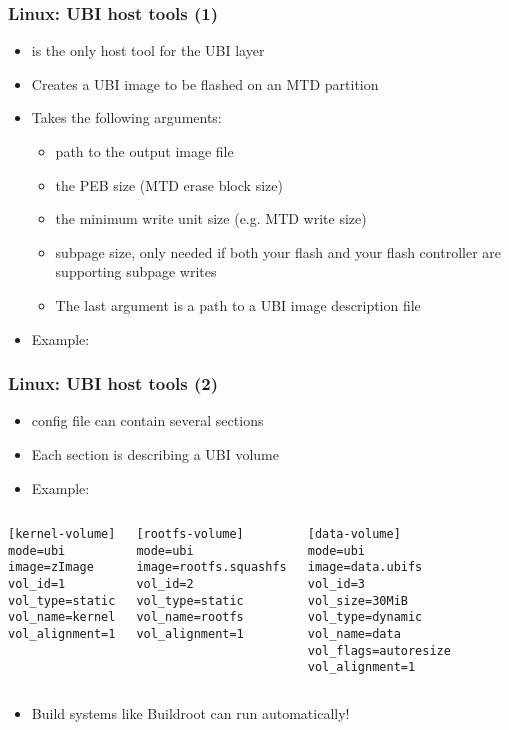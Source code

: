 \begin{frame}
  \frametitle{Linux: UBI host tools (1)}
  \begin{itemize}
  \item {} is the only host tool for the UBI layer
  \item Creates a UBI image to be flashed on an MTD partition
  \item Takes the following arguments:
    \begin{itemize}
    \item {} path to the output image file
    \item {} the PEB size (MTD erase block size)
    \item {} the minimum write unit size (e.g.
      MTD write size)
    \item {} subpage size, only needed if both
      your flash and your flash controller are supporting subpage
      writes
    \item The last argument is a path to a UBI image description file
    \end{itemize}
  \item Example: 
  \end{itemize}
\end{frame}

\begin{frame}[fragile]
  \frametitle{Linux: UBI host tools (2)}
  \begin{itemize}
  \item {} config file can contain several sections
  \item Each section is describing a UBI volume
  \item Example:
  \end{itemize}
  \begin{columns}
\small
\begin{verbatim}
[kernel-volume]
mode=ubi
image=zImage
vol_id=1
vol_type=static
vol_name=kernel
vol_alignment=1
\end{verbatim}
\small
\begin{verbatim}
[rootfs-volume]
mode=ubi
image=rootfs.squashfs
vol_id=2
vol_type=static
vol_name=rootfs
vol_alignment=1
\end{verbatim}
\small
\begin{verbatim}
[data-volume]
mode=ubi
image=data.ubifs
vol_id=3
vol_size=30MiB
vol_type=dynamic
vol_name=data
vol_flags=autoresize
vol_alignment=1
\end{verbatim}
  \end{columns}
  \begin{itemize}
  \item Build systems like Buildroot can run  automatically!
  \end{itemize}
\end{frame}

